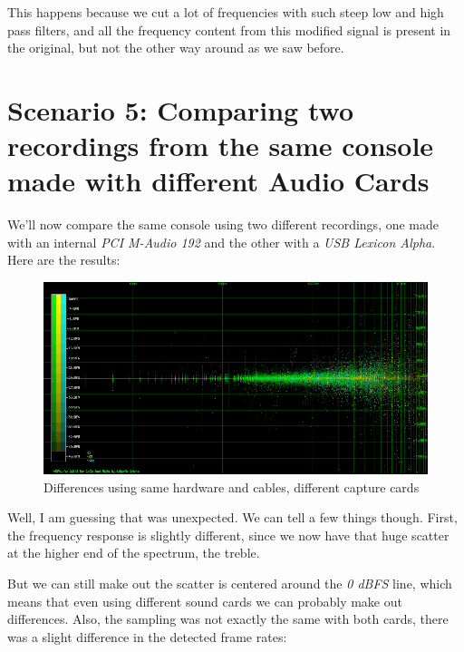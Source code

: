 \documentclass[10pt,a4paper]{report}
\begin{document}
This happens because we cut a lot of frequencies with such steep low and high pass filters, and all the frequency content from this modified signal is present in the original, but not the other way around as we saw before.

\section{Scenario 5: Comparing two recordings from the same console made with different Audio Cards}

We'll now compare the same console using two different recordings, one made with an internal \textit{PCI M-Audio 192} and the other with a \textit{USB Lexicon Alpha}. Here are the results:

\begin{figure}[H]
	\centering
	\includegraphics[width=1.0\linewidth]{plots/Plot5-1-All}
	\caption[Reversed FM Missing]{Differences using same hardware and cables, different capture cards}
	\label{fig:plot5-1-all}
\end{figure}

Well, I am guessing that was unexpected. We can tell a few things though. First, the frequency response is slightly different, since we now have that huge scatter at the higher end of the spectrum, the treble.

But we can still make out the scatter is centered around the \textit{0 dBFS} line, which means that even using different sound cards we can probably make out differences. Also, the sampling was not exactly the same with both cards, there was a slight difference in the detected frame rates:
\end{document}
